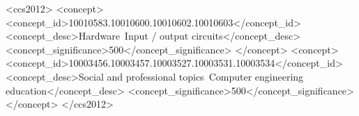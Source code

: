 \documentclass[sigconf, authorversion, nonacm]{acmart}
\begin{document}
\begin{CCSXML}
<ccs2012>
   <concept>
       <concept_id>10010583.10010600.10010602.10010603</concept_id>
       <concept_desc>Hardware~Input / output circuits</concept_desc>
       <concept_significance>500</concept_significance>
       </concept>
   <concept>
       <concept_id>10003456.10003457.10003527.10003531.10003534</concept_id>
       <concept_desc>Social and professional topics~Computer engineering education</concept_desc>
       <concept_significance>500</concept_significance>
       </concept>
 </ccs2012>
\end{CCSXML}

\maketitle
\end{document}

